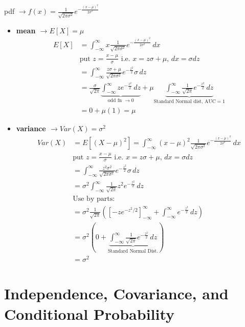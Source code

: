 pdf $\rightarrow f(x) = \frac{1}{\sqrt{2\pi\sigma^2}} e^{-\frac{(x-\mu)^2}{2\sigma^2}}$
\begin{itemize}
    \item \textbf{mean $\rightarrow E[X] = \mu$}
    \begin{align*}
        E[X] &= \int_{-\infty}^\infty x \frac{1}{\sqrt{2\pi\sigma^2}} e^{-\frac{(x-\mu)^2}{2\sigma^2}} \, dx \\
        &\text{put } z = \frac{x-\mu}{\sigma} \text{ i.e. } x = z\sigma + \mu, \, dx = \sigma dz \\
        &= \int_{-\infty}^\infty \frac{z\sigma + \mu}{\sqrt{2\pi\sigma^2}} e^{-\frac{z^2}{2}} \sigma \, dz \\
        &= \frac{\sigma}{\sqrt{2\pi}} \underbrace{\int_{-\infty}^\infty z e^{-\frac{z^2}{2}} \, dz}_{\text{odd fn } \rightarrow 0} + \mu \underbrace{\int_{-\infty}^\infty \frac{1}{\sqrt{2\pi}} e^{-\frac{z^2}{2}} \, dz}_{\text{Standard Normal dist, AUC}=1} \\
        &= 0 + \mu(1) = \mu
    \end{align*}

    \item \textbf{variance $\rightarrow Var(X) = \sigma^2$}
    \begin{align*}
        Var(X) &= E[(X-\mu)^2] = \int_{-\infty}^\infty (x-\mu)^2 \frac{1}{\sqrt{2\pi\sigma^2}} e^{-\frac{(x-\mu)^2}{2\sigma^2}} \, dx \\
        &\text{put } z = \frac{x-\mu}{\sigma} \text{ i.e. } x = z\sigma + \mu, \, dx = \sigma dz \\
        &= \int_{-\infty}^\infty \frac{z^2 \sigma^2}{\sqrt{2\pi\sigma^2}} e^{-\frac{z^2}{2}} \sigma \, dz \\
        &= \sigma^2 \int_{-\infty}^\infty \frac{1}{\sqrt{2\pi}} z^2 e^{-\frac{z^2}{2}} \, dz \\
        &\text{Use by parts:} \\
        &= \sigma^2 \frac{1}{\sqrt{2\pi}} \left( \left[ -z e^{-z^2/2} \right]_{-\infty}^\infty + \int_{-\infty}^\infty e^{-\frac{z^2}{2}} \, dz \right) \\
        &= \sigma^2 \left( 0 + \underbrace{\int_{-\infty}^\infty \frac{1}{\sqrt{2\pi}} e^{-\frac{z^2}{2}} \, dz}_{\text{Standard Normal Dist.}} \right) \\
        &= \sigma^2
    \end{align*}
\end{itemize}

\section{\textcolor{secondary}{Independence, Covariance, and Conditional Probability}}


